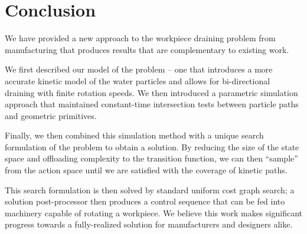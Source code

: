 						\chapter{Conclusion}

We have provided a new approach to the workpiece draining problem from manufacturing that produces results that are complementary to existing work.

We first described our model of the problem -- one that introduces a more accurate kinetic model of the water particles and allows for bi-directional draining with finite rotation speeds. We then introduced a parametric simulation approach that maintained constant-time intersection tests between particle paths and geometric primitives.

Finally, we then combined this simulation method with a unique search formulation of the problem to obtain a solution. By reducing the size of the state space and offloading complexity to the transition function, we can then ``sample'' from the action space until we are satisfied with the coverage of kinetic paths.

This search formulation is then solved by standard uniform cost graph search; a solution post-processor then produces a control sequence that can be fed into machinery capable of rotating a workpiece. We believe this work makes significant progress towards a fully-realized solution for manufacturers and designers alike.
